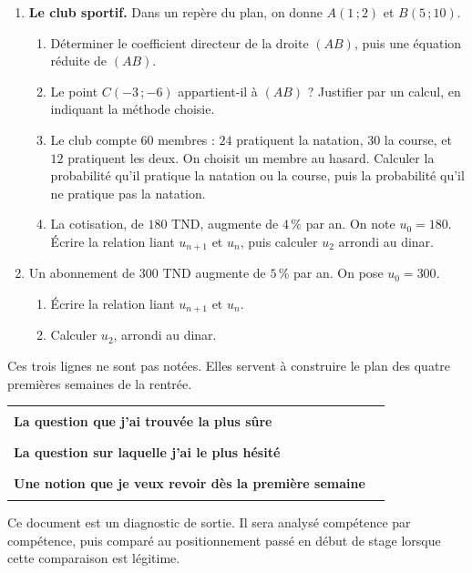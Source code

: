 \documentclass[10pt,a4paper]{article}
\begin{document}
\needspace{68mm}\par\vspace{3mm}
\begin{enumerate}
\needspace{22mm}
\item[\textbf{C1.}] \textbf{Le club sportif.} Dans un repère du plan, on donne $A(1\,;2)$ et $B(5\,;10)$.
\begin{enumerate}
\item Déterminer le coefficient directeur de la droite $(AB)$, puis une équation réduite de $(AB)$.
\item Le point $C(-3\,;-6)$ appartient-il à $(AB)$ ? Justifier par un calcul, en indiquant la méthode choisie.
\item Le club compte $60$ membres : $24$ pratiquent la natation, $30$ la course, et $12$ pratiquent les deux.
On choisit un membre au hasard. Calculer la probabilité qu'il pratique la natation ou la course,
puis la probabilité qu'il ne pratique pas la natation.
\item La cotisation, de $180$ TND, augmente de $4\,\%$ par an. On note $u_0 = 180$. Écrire la relation liant
$u_{n+1}$ et $u_n$, puis calculer $u_2$ arrondi au dinar.
\end{enumerate}
\par\vspace{1.2mm}
\needspace{22mm}
\item[\textbf{C2.}] Un abonnement de $300$ TND augmente de $5\,\%$ par an. On pose $u_0 = 300$.
\begin{enumerate}
\item Écrire la relation liant $u_{n+1}$ et $u_n$.
\item Calculer $u_2$, arrondi au dinar.
\end{enumerate}
\par\vspace{1.2mm}
\end{enumerate}
\brouillon{\dimexpr\textheight/3\relax}
\newpage
{}
\begin{methodbox}Ces trois lignes ne sont pas notées. Elles servent à construire le plan des quatre premières semaines de la rentrée.\end{methodbox}
\par\noindent\begin{tabularx}{\linewidth}{>{\bfseries}p{62mm} X}
\toprule
La question que j'ai trouvée la plus sûre & \rule{85mm}{0.32pt} \\
La question sur laquelle j'ai le plus hésité & \rule{85mm}{0.32pt} \\
Une notion que je veux revoir dès la première semaine & \rule{85mm}{0.32pt} \\
\bottomrule\end{tabularx}
\vfill
\begin{graybox}\small Ce document est un diagnostic de sortie. Il sera analysé compétence par compétence, puis comparé au positionnement passé en début de stage lorsque cette comparaison est légitime.\end{graybox}
\end{document}
